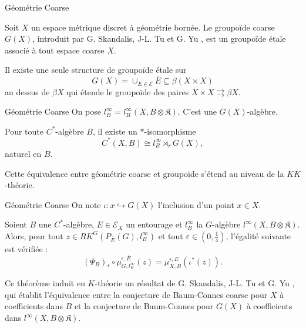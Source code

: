 \begin{frame}{Géométrie Coarse}

Soit $X$ un espace métrique discret à géométrie bornée. Le groupoïde coarse $G(X)$, introduit par G. Skandalis, J-L. Tu et G. Yu \cite{SkTuYu}, est un groupoïde étale associé à tout espace coarse $X$.\\
\vspace{0.3 cm}
\begin{definitionfr}
Il existe une seule structure de groupoïde étale sur 
\[G(X) = \cup_{E\in\mathcal E }\overline{E}\subseteq \beta (X\times X)\]
au dessus de $\beta X$ qui étende le groupoïde des paires $X\times X\rightrightarrows \beta X$.
\end{definitionfr} 

\end{frame}

\begin{frame}{Géométrie Coarse}
On pose $l_B^\infty = l_B^\infty(X,B\otimes \mathfrak K)$. C'est une $G(X)$-algèbre.\\
\vspace{0.3 cm}
\begin{propfr}
Pour toute $C^*$-algèbre $B$, il existe un $*$-isomorphisme 
\[C^*(X,B) \cong l_B^\infty \rtimes_r G(X),\]
naturel en $B$.
\end{propfr} 
\vspace{0.3 cm}
Cette équivalence entre géométrie coarse et groupoïde s'étend au niveau de la $KK$-théorie.
\end{frame}


\begin{frame}{Géométrie Coarse}
On note $\iota : {x}\hookrightarrow G(X)$ l'inclusion d'un point $x\in X$.\\
\vspace{0.3 cm}
\begin{thmfr}
Soient $B$ une $C^*$-algèbre, $E\in\mathcal E_X$ un entourage et $l_B^\infty$ la $G$-algèbre $l^\infty(X,B\otimes \mathfrak K)$. Alors, pour tout $z\in RK^G(P_{\overline E}(G),l_B^\infty)$ et tout $\varepsilon\in(0,\frac{1}{4})$, l'égalité suivante est vérifiée :
\[(\Psi_B)_*\circ\mu^{\epsilon,\overline E}_{G,l_B^\infty} (z) = \mu_{X,B}^{\epsilon,E}(\iota^*(z)).\]
\end{thmfr}
\vspace{0.3 cm}
Ce théorème induit en $K$-théorie un résultat de G. Skandalis, J-L. Tu et G. Yu \cite{SkTuYu}, qui établit l'équivalence entre la conjecture de Baum-Connes coarse pour $X$ à coefficients dans $B$ et la conjecture de Baum-Connes pour $G(X)$ à coefficients dans $l^\infty(X,B\otimes \mathfrak K)$.
\end{frame}

